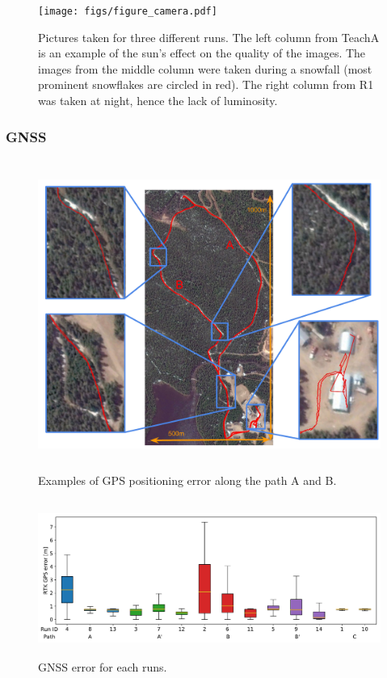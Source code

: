 \begin{figure} [htpb]
	\centering
	\texttt{[image: figs/figure\_camera.pdf]}
	\caption{Pictures taken for three different runs. The left column from TeachA is an example of the sun's effect on the quality of the images. The images from the middle column were taken during a snowfall (most prominent snowflakes are circled in red). The right column from R1 was taken at night, hence the lack of luminosity.}
	\label{fig:cameras_expo}
\end{figure}

\subsubsection{GNSS}
\label{sec:res_gnss}

\lightlipsum[1]

\begin{figure} [htpb]
	\centering
	\includegraphics[height=4.0in]{./figs/GPS/FR_gps_data_fails2.pdf}
	\caption{Examples of GPS positioning error along the path A and B.}
	\label{fig:gnss_error_path}
\end{figure}

\begin{figure} [htpb]
	\centering
	\includegraphics[height=2.0in]{./figs/GPS/RTK_error.pdf}
	\caption{GNSS error for each runs.}
	\label{fig:gnss_run_error}
\end{figure}

